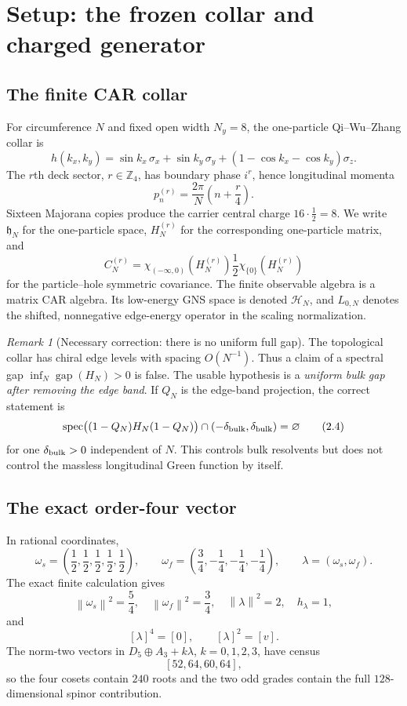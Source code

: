 \documentclass[11pt]{article}
\theoremstyle{remark}
\newtheorem{remark}[theorem]{Remark}
\newcommand{\Hh}{\mathcal H}
\newcommand{\Z}{\mathbb Z}
\newcommand{\norm}[1]{\left\lVert#1\right\rVert}
\begin{document}
\section{Setup: the frozen collar and charged generator}
\label{sec:setup}

\subsection{The finite CAR collar}

For circumference $N$ and fixed open width $N_y=8$, the one-particle
Qi--Wu--Zhang collar is
\[
 h(k_x,k_y)
 =\sin k_x\,\sigma_x+\sin k_y\,\sigma_y+
   (1-\cos k_x-\cos k_y)\sigma_z .
\tag{2.1}\label{eq:qwz}
\]
The $r$th deck sector, $r\in\Z_4$, has boundary phase $i^r$, hence
longitudinal momenta
\[
 p_n^{(r)}=\frac{2\pi}{N}\left(n+\frac r4\right).
\tag{2.2}\label{eq:momentum}
\]
Sixteen Majorana copies produce the carrier central charge
$16\cdot\frac12=8$.  We write $\mathfrak h_N$ for the one-particle space,
$H_N^{(r)}$ for the corresponding one-particle matrix, and
\[
 C_N^{(r)}
 =\chi_{(-\infty,0)}(H_N^{(r)})
  \frac12\chi_{\{0\}}(H_N^{(r)})
\tag{2.3}\label{eq:covariance}
\]
for the particle--hole symmetric covariance.  The finite observable
algebra is a matrix CAR algebra.  Its low-energy GNS space is denoted
$\Hh_N$, and $L_{0,N}$ denotes the shifted, nonnegative edge-energy
operator in the scaling normalization.

\begin{remark}[Necessary correction: there is no uniform full gap]
\label{rem:gapcorrection}
The topological collar has chiral edge levels with spacing $O(N^{-1})$.
Thus a claim of a spectral gap
$\inf_N\operatorname{gap}(H_N)>0$ is false.  The usable hypothesis is a
\emph{uniform bulk gap after removing the edge band}.  If $Q_N$ is the
edge-band projection, the correct statement is
\[
 \operatorname{spec}\bigl((1-Q_N)H_N(1-Q_N)\bigr)
 \cap(-\delta_{\rm bulk},\delta_{\rm bulk})=\varnothing
\tag{2.4}\label{eq:bulkgap}
\]
for one $\delta_{\rm bulk}>0$ independent of $N$.  This controls bulk
resolvents but does not control the massless longitudinal Green function
by itself.
\end{remark}

\subsection{The exact order-four vector}

In rational coordinates,
\[
 \omega_s=\left(\frac12,\frac12,\frac12,\frac12,\frac12\right),
 \qquad
 \omega_f=\left(\frac34,-\frac14,-\frac14,-\frac14\right),
 \qquad
 \lambda=(\omega_s,\omega_f).
\tag{2.5}\label{eq:lambda}
\]
The exact finite calculation gives
\[
 \norm{\omega_s}^2=\frac54,\quad
 \norm{\omega_f}^2=\frac34,\quad
 \norm{\lambda}^2=2,\quad h_\lambda=1,
\tag{2.6}\label{eq:lambda-norm}
\]
and
\[
 [\lambda]^4=[0],\qquad [\lambda]^2=[v].
\tag{2.7}\label{eq:lambda-order}
\]
The norm-two vectors in
$D_5\oplus A_3+k\lambda$, $k=0,1,2,3$, have census
\[
 [52,64,60,64],
\tag{2.8}\label{eq:census}
\]
so the four cosets contain $240$ roots and the two odd grades contain the
full $128$-dimensional spinor contribution.
\end{document}
